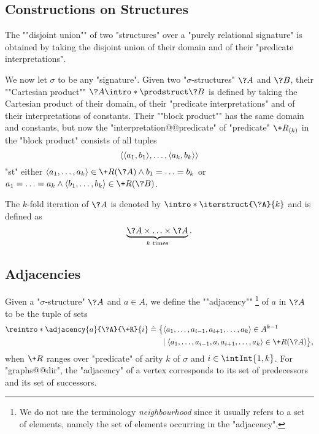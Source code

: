 \subsection{Constructions on Structures}

The \AP""disjoint union"" of two "structures" over a
"purely relational signature" 
is obtained by taking the disjoint union of their domain and of
their "predicate interpretations".

We now let $\sigma$ to be any "signature".
Given two "$\sigma$-structures" $\?A$ and $\?B$, their
""Cartesian product"" \AP$\?A \intro*\prodstruct \?B$
is defined by taking the Cartesian product of their domain, of
their "predicate interpretations" and of their interpretations of constants. 
Their ""block product"" has the same domain and constants,
but now the "interpretation@@predicate" of "predicate" $\+R_{(k)}$
in the "block product" consists of all tuples
\[\langle\langle a_1,b_1\rangle, \dotsc, \langle a_k,b_k\rangle\rangle\] 
"st" either $\tup{a_1, \dotsc, a_k} \in \+R(\?A)
\land b_1 = \dotsc = b_k$ or 
$a_1 = \dotsc = a_k
\land \tup{b_1, \dotsc, b_k} \in \+R(\?B)$.

The $k$-fold iteration of $\?A$ is denoted by
$\intro*\iterstruct{\?A}{k}$ and is defined as
\[
	\underbrace{\?A \times \dotsc \times \?A}_{k \text{ times}}.
\]

\subsection{Adjacencies}

Given a "$\sigma$-structure" $\?A$ and $a \in A$, we define the \AP""adjacency""%
\footnote{We do not use the terminology \emph{neighbourhood} since it usually refers
to a set of elements, namely the set of elements occurring in the "adjacency".}
of $a$ in $\?A$ to be the tuple of sets%
\AP{}
\begin{align*}
	\reintro*\adjacency{a}{\?A}{\+R}{i} & \defeq
		\big\{
			\langle a_1, \dotsc, a_{i-1}, a_{i+1}, \dotsc, a_k \rangle \in A^{k-1}
			\\ & \hphantom{\defeq \big\{ }\mid
			\langle a_1, \dotsc, a_{i-1}, a, a_{i+1}, \dotsc, a_k \rangle \in \+R(\?A)
		\big\},
\end{align*}
when $\+R$ ranges over "predicate" of arity $k$ of $\sigma$ and $i \in \intInt{1,k}$. 
For "graphs@@dir", the "adjacency" of a vertex corresponds to its set of predecessors and
its set of successors.

